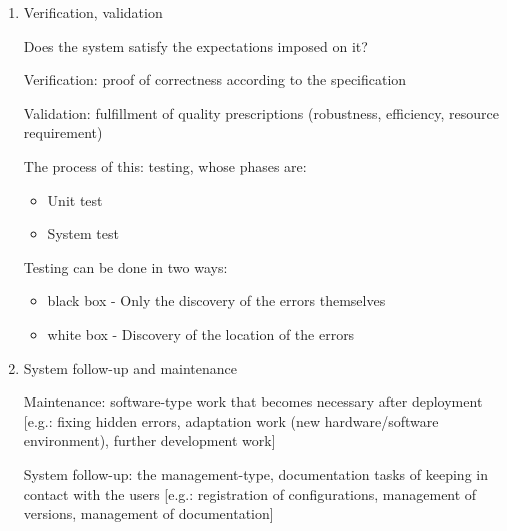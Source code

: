 \documentclass[margin=0px]{article}
\begin{document}
\begin{enumerate}
          One fundamental question of implementation is the implementation style.
          A few important elements of good programming style:
          \begin{itemize}
              \item application of different levels of abstraction
              \item use of the inheritance technique, hierarchical system of abstraction
                    levels
              \item breaking into abstraction levels within a class (declaration + realization)
              \item limited visibility;
              \item information hiding;
              \item encapsulation.
          \end{itemize}

    \item Verification, validation

          Does the system satisfy the expectations imposed on it?

          Verification: proof of correctness according to the specification

          Validation: fulfillment of quality prescriptions (robustness, efficiency, resource requirement)

          The process of this: testing, whose phases are:
          \begin{itemize}
              \item Unit test
              \item System test
          \end{itemize}
          Testing can be done in two ways:
          \begin{itemize}
              \item black box - Only the discovery of the errors themselves
              \item white box - Discovery of the location of the errors
          \end{itemize}

    \item System follow-up and maintenance

          Maintenance: software-type work that becomes necessary after deployment [e.g.: fixing hidden errors, adaptation work (new hardware/software environment), further development work]

          System follow-up: the management-type, documentation tasks of keeping in contact with the users [e.g.: registration of configurations, management of versions, management of documentation]


\end{enumerate}
\end{document}
